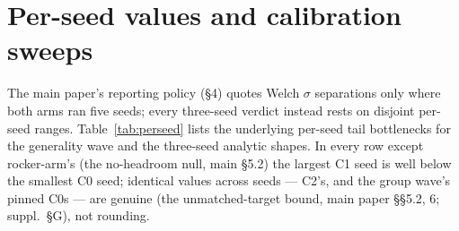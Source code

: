 \section{Per-seed values and calibration sweeps}
\label{app:perseed}


The main paper's reporting policy (\S 4) quotes Welch $\sigma$
separations only where both arms ran five seeds; every three-seed
verdict instead rests on disjoint per-seed ranges.
Table~\ref{tab:perseed} lists the underlying per-seed tail bottlenecks
for the generality wave and the three-seed analytic shapes. In every
row except rocker-arm's (the no-headroom null, main \S5.2) the largest
C1 seed is well below the smallest C0 seed; identical values across
seeds --- C2's, and the group wave's pinned C0s --- are genuine
(the unmatched-target bound, main paper \S\S5.2, 6; suppl.\ \S G), not
rounding.

